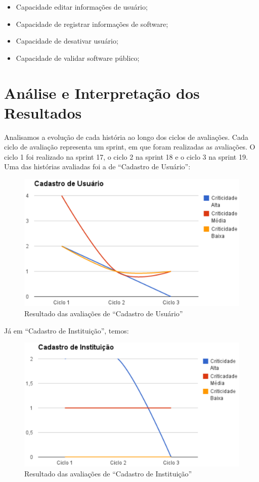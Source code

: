 \begin{itemize}
	\item Capacidade editar informações de usuário;
	\item Capacidade de registrar informações de software;
	\item Capacidade de desativar usuário;
	\item Capacidade de validar software público;
\end{itemize}


\section{Análise e Interpretação dos Resultados}
\label{analise}

Analisamos a evolução de cada história ao longo dos ciclos de avaliações. Cada ciclo de avaliação representa um sprint, em que foram realizadas as avaliações. O ciclo 1 foi realizado na sprint 17, o ciclo 2 na sprint 18 e o ciclo 3 na sprint 19. Uma das histórias avaliadas foi a de ``Cadastro de Usuário'':


\begin{figure}[h!]
    	\centering
    	\includegraphics[keepaspectratio=true,scale=0.62]
      		{figuras/graf01.eps}
    	\caption{Resultado das avaliações de ``Cadastro de Usuário''}
    	\label{avaliacaouser}
\end{figure}

Já em ``Cadastro de Instituição'', temos:

\begin{figure}[h!]
    	\centering
    	\includegraphics[keepaspectratio=true,scale=0.62]
      		{figuras/graf02.eps}
    	\caption{Resultado das avaliações de ``Cadastro de Instituição''}
    	\label{avaliacaoinstitucion}
\end{figure}

